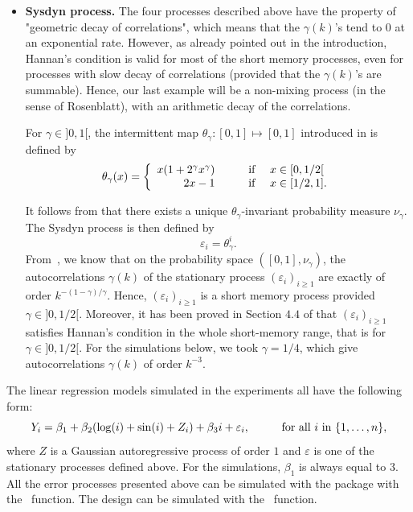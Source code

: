 \begin{itemize}
\item {\bf  Sysdyn process.}
The four processes described above have the property of "geometric decay of correlations", which means that the $\gamma(k)$'s tend to $0$ at an exponential rate. However, as already pointed out in the introduction, Hannan's condition is valid for most of the short memory processes, even for processes with slow decay of correlations (provided that the $\gamma(k)$'s are summable). Hence, our last example will be a non-mixing process (in the sense of Rosenblatt), with an arithmetic decay of the correlations.

For $\gamma \in ]0,1[$,  the intermittent map $\theta_{\gamma} : [0,1] \mapsto [0,1]$ introduced in \cite{liverani1999probabilistic} is defined by
\[\theta_{\gamma}(x) =
\left\{
\begin{array}{r c l}
x(1 + 2^{\gamma} x^{\gamma}) \qquad &\text{if}& \ x \in [0, 1/2[ \\
2x - 1 \qquad &\text{if}& \ x \in [1/2, 1].\\
\end{array}
\right.\]

It follows from \cite{liverani1999probabilistic} that there exists a unique $\theta_{\gamma}$-invariant probability measure $\nu_{\gamma}$. The Sysdyn process is then defined by
$$\varepsilon_{i} = \theta_{\gamma}^{i}.$$
From~\cite{liverani1999probabilistic}, we know that on the probability space $([0,1], \nu_{\gamma})$, the autocorrelations $\gamma(k)$ of the stationary process $(\varepsilon_{i})_{i \geq 1}$ are exactly of order $k^{-(1-\gamma)/\gamma}$. Hence, $(\varepsilon_{i})_{i \geq 1}$ is a short memory process provided $\gamma \in ]0, 1/2[$. Moreover, it has been proved in Section $4.4$ of \cite{caron2018} that $(\varepsilon_{i})_{i \geq 1}$ satisfies Hannan's condition in the whole short-memory range, that is for $\gamma \in ]0, 1/2[$.
For the simulations below, we took $\gamma = 1/4$, which give autocorrelations $\gamma(k)$ of order $k^{-3}$.
\end{itemize}

\medskip

The linear regression models simulated in the experiments  all have the following form:
\begin{equation}
Y_{i} = \beta_{1} + \beta_{2} (\log(i) + \sin(i) + Z_{i}) + \beta_{3} i + \varepsilon_{i}, \hskip 1cm \textrm{for all $i$ in } \{1, \ldots, n\},
\label{reglinsimu}
\end{equation}
where $Z$ is a Gaussian autoregressive process of order $1$ and $\varepsilon$ is one of the stationary processes defined above. For the simulations, $\beta_{1}$ is always equal to $3$. All the error processes presented above can be simulated with the  package with the ~function. The design can be simulated with the ~function.

